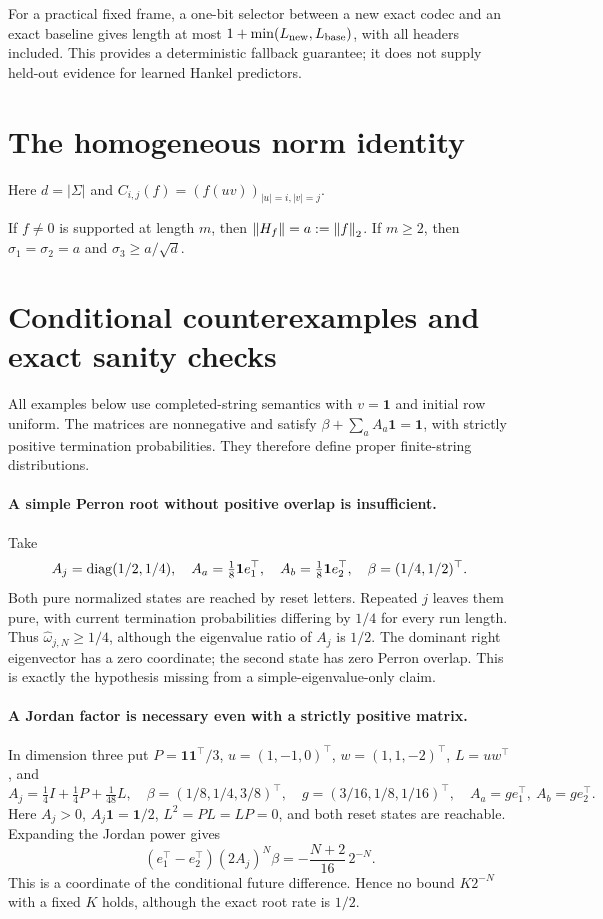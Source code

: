 For a practical fixed frame, a one-bit selector between a new exact
codec and an exact baseline gives length at most
$1+\min(L_{\rm new},L_{\rm base})$, with all headers included.
This provides a deterministic fallback guarantee; it does not supply
held-out evidence for learned Hankel predictors.

\section{The homogeneous norm identity}
Here $d=|\Sigma|$ and $C_{i,j}(f)=(f(uv))_{|u|=i,|v|=j}$.
\begin{lemma}\label{III:S:lem:homogeneous}
If $f\ne0$ is supported at length $m$, then $\left\lVert H_f\right\rVert=a:=\left\lVert f\right\rVert_2$. If $m\ge2$, then $\sigma_1=\sigma_2=a$ and $\sigma_3\ge a/\sqrt d$.
\end{lemma}


\section{Conditional counterexamples and exact sanity checks}\label{III:S:app:conditional}
All examples below use completed-string semantics with $v=\mathbf1$ and initial row uniform. The matrices are nonnegative and satisfy $\beta+\sum_aA_a\mathbf1=\mathbf1$, with strictly positive termination probabilities. They therefore define proper finite-string distributions.

\paragraph{A simple Perron root without positive overlap is insufficient.}
Take
\[
 A_j=\operatorname{diag}(1/2,1/4),\quad
 A_a=\tfrac18\mathbf1e_1^\top,\quad
 A_b=\tfrac18\mathbf1e_2^\top,\quad\beta=(1/4,1/2)^\top.
\]
Both pure normalized states are reached by reset letters. Repeated $j$ leaves them pure, with current termination probabilities differing by $1/4$ for every run length. Thus $\widehat\omega_{j,N}\ge1/4$, although the eigenvalue ratio of $A_j$ is $1/2$. The dominant right eigenvector has a zero coordinate; the second state has zero Perron overlap. This is exactly the hypothesis missing from a simple-eigenvalue-only claim.

\paragraph{A Jordan factor is necessary even with a strictly positive matrix.}
In dimension three put $P=\mathbf1\mathbf1^\top/3$, $u=(1,-1,0)^\top$, $w=(1,1,-2)^\top$, $L=uw^\top$, and
\[
 A_j=\tfrac14I+\tfrac14P+\tfrac1{48}L,\quad
 \beta=(1/8,1/4,3/8)^\top,\quad
 g=(3/16,1/8,1/16)^\top,\quad A_a=ge_1^\top,\ A_b=ge_2^\top.
\]
Here $A_j>0$, $A_j\mathbf1=\mathbf1/2$, $L^2=PL=LP=0$, and both reset states are reachable. Expanding the Jordan power gives
\[
 (e_1^\top-e_2^\top)(2A_j)^N\beta
       =-\frac{N+2}{16}\,2^{-N}.
\]
This is a coordinate of the conditional future difference. Hence no bound $K2^{-N}$ with a fixed $K$ holds, although the exact root rate is $1/2$.

